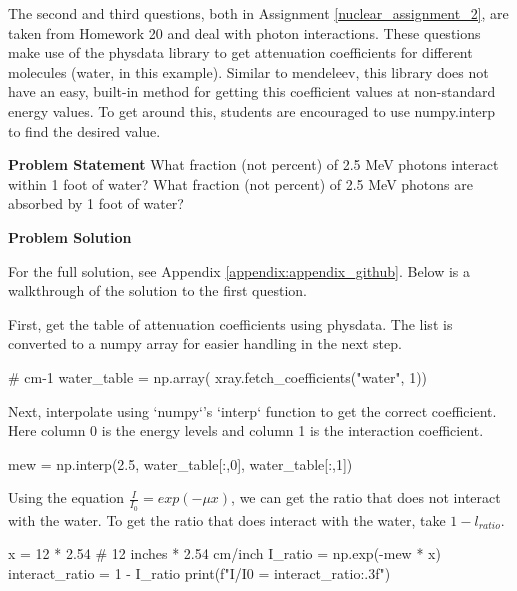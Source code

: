The second and third questions, both in Assignment \ref{nuclear_assignment_2}, are taken 
from Homework 20 and deal with photon interactions. 
These questions make use of the physdata library to get attenuation coefficients for different
molecules (water, in this example). Similar to mendeleev, this library does not have an easy, 
built-in method for getting this coefficient values at non-standard energy values. To get around
this, students are encouraged to use numpy.interp to find the desired value.

\label{nuclear_assignment_2}

\begin{tcolorbox}[breakable, enhanced jigsaw, title=NE 495: Assignment \ref{nuclear_assignment_2}, 
    colframe=ksu-purple, colback=ksu-gray]

    \textbf{Problem Statement}
    What fraction (not percent) of 2.5 MeV photons interact within 1 foot of water? What fraction 
    (not percent) of 2.5 MeV photons are absorbed by 1 foot of water?

    \tcblower
    \textbf{Problem Solution}

    For the full solution, see Appendix \ref{appendix:appendix_github}. Below is a walkthrough
    of the solution to the first question.

    First, get the table of attenuation coefficients using physdata. The list is converted to 
    a numpy array for easier handling in the next step.

\begin{python}
# cm-1
water_table = np.array(
    xray.fetch_coefficients("water", 1))
\end{python}

Next, interpolate using `numpy`'s `interp` function to get the correct coefficient. Here column 
0 is the energy levels and column 1 is the interaction coefficient.

\begin{python}
mew = np.interp(2.5, water_table[:,0], water_table[:,1])
\end{python}

Using the equation $ \frac{I}{I_0} = exp(-\mu x) $, we can get the ratio that does not 
interact with the water. To get the ratio that does interact with the water, take 
$ 1 - l_{ratio} $.

\begin{python}
x = 12 * 2.54 # 12 inches * 2.54 cm/inch
I_ratio = np.exp(-mew * x)
interact_ratio = 1 - I_ratio
print(f"I/I0 = {interact_ratio:.3f}")
\end{python}

\end{tcolorbox}

